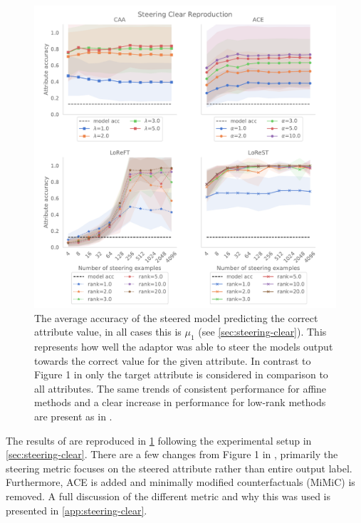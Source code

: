 \begin{figure}
    \centering
    \captionsetup{width=.9\textwidth}
    \includegraphics[width=\textwidth]{figures/steering_clear.pdf}
    \caption{
        The average accuracy of the steered model predicting the correct attribute value, in all cases this is $\mu_1$ (see \cref{sec:steering-clear}).
        This represents how well the adaptor was able to steer the models output towards the correct value for the given attribute.
        In contrast to Figure 1 in \citet{steering-clear} only the target attribute is considered in comparison to all attributes.
        The same trends of consistent performance for affine methods and a clear increase in performance for low-rank methods are present as in \citet{steering-clear}.
    }
    \label{fig:steering-clear}
\end{figure}

The results of \cite{steering-clear} are reproduced in \cref{fig:steering-clear} following the experimental setup in \cref{sec:steering-clear}.
There are a few changes from Figure 1 in \cite{steering-clear}, primarily the steering metric focuses on the steered attribute rather than entire output label.
Furthermore, ACE is added and minimally modified counterfactuals (MiMiC) \citep{mimic} is removed.
A full discussion of the different metric and why this was used is presented in \cref{app:steering-clear}.

